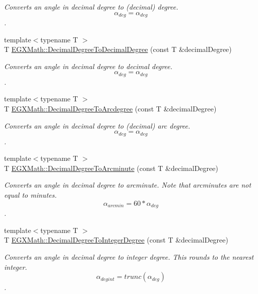 \begin{DoxyCompactItemize}
\begin{DoxyCompactList}\small\item\em Converts an angle in decimal degree to (decimal) degree. \[\alpha_{deg}=\alpha_{deg}\]. \end{DoxyCompactList}\item 
{\footnotesize template$<$typename T $>$ }\\T \mbox{\hyperlink{group___e_g_x_math-_angle_conversions-_decimal_degree_gafccf9cd779903872887978ab9d79661f}{E\+G\+X\+Math\+::\+Decimal\+Degree\+To\+Decimal\+Degree}} (const T \&decimal\+Degree)
\begin{DoxyCompactList}\small\item\em Converts an angle in decimal degree to decimal degree. \[\alpha_{deg}=\alpha_{deg}\]. \end{DoxyCompactList}\item 
{\footnotesize template$<$typename T $>$ }\\T \mbox{\hyperlink{group___e_g_x_math-_angle_conversions-_decimal_degree_gacdd463fcabffeb598ebda65b012ce743}{E\+G\+X\+Math\+::\+Decimal\+Degree\+To\+Arcdegree}} (const T \&decimal\+Degree)
\begin{DoxyCompactList}\small\item\em Converts an angle in decimal degree to (decimal) arc degree. \[\alpha_{deg}=\alpha_{deg}\]. \end{DoxyCompactList}\item 
{\footnotesize template$<$typename T $>$ }\\T \mbox{\hyperlink{group___e_g_x_math-_angle_conversions-_decimal_degree_ga6b6ea6e45d2a13f556824ca419cc9fbd}{E\+G\+X\+Math\+::\+Decimal\+Degree\+To\+Arcminute}} (const T \&decimal\+Degree)
\begin{DoxyCompactList}\small\item\em Converts an angle in decimal degree to arcminute. Note that arcminutes are not equal to minutes. \[\alpha_{arcmin}= 60 * \alpha_{deg}\]. \end{DoxyCompactList}\item 
{\footnotesize template$<$typename T $>$ }\\T \mbox{\hyperlink{group___e_g_x_math-_angle_conversions-_decimal_degree_ga115239ea7202dbc6a6c9fba68e0ac189}{E\+G\+X\+Math\+::\+Decimal\+Degree\+To\+Integer\+Degree}} (const T \&decimal\+Degree)
\begin{DoxyCompactList}\small\item\em Converts an angle in decimal degree to integer degree. This rounds to the nearest integer. \[\alpha_{deg int}=trunc(\alpha_{deg})\]. \end{DoxyCompactList}\item 

\end{DoxyCompactItemize}
